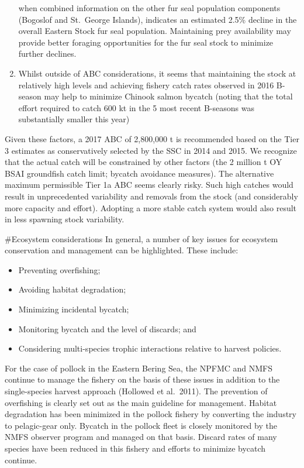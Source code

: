 \begin{enumerate}
  when combined information on the other fur seal population components
  (Bogoslof and St.~George Islands), indicates an estimated 2.5\%
  decline in the overall Eastern Stock fur seal population. Maintaining
  prey availability may provide better foraging opportunities for the
  fur seal stock to minimize further declines.
\item
  Whilst outside of ABC considerations, it seems that maintaining the
  stock at relatively high levels and achieving fishery catch rates
  observed in 2016 B-season may help to minimize Chinook salmon bycatch
  (noting that the total effort required to catch 600 kt in the 5 most
  recent B-seasons was substantially smaller this year)
\end{enumerate}

Given these factors, a 2017 ABC of 2,800,000 t is recommended based on
the Tier 3 estimates as conservatively selected by the SSC in 2014 and
2015. We recognize that the actual catch will be constrained by other
factors (the 2 million t OY BSAI groundfish catch limit; bycatch
avoidance measures). The alternative maximum permissible Tier 1a ABC
seems clearly risky. Such high catches would result in unprecedented
variability and removals from the stock (and considerably more capacity
and effort). Adopting a more stable catch system would also result in
less spawning stock variability.

\#Ecosystem considerations In general, a number of key issues for
ecosystem conservation and management can be highlighted. These include:

\begin{itemize}
\item
  Preventing overfishing;
\item
  Avoiding habitat degradation;
\item
  Minimizing incidental bycatch;
\item
  Monitoring bycatch and the level of discards; and
\item
  Considering multi-species trophic interactions relative to harvest
  policies.
\end{itemize}

For the case of pollock in the Eastern Bering Sea, the NPFMC and NMFS
continue to manage the fishery on the basis of these issues in addition
to the single-species harvest approach (Hollowed et al.~2011). The
prevention of overfishing is clearly set out as the main guideline for
management. Habitat degradation has been minimized in the pollock
fishery by converting the industry to pelagic-gear only. Bycatch in the
pollock fleet is closely monitored by the NMFS observer program and
managed on that basis. Discard rates of many species have been reduced
in this fishery and efforts to minimize bycatch continue.

